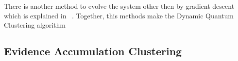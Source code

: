 There is another method to evolve the system other then by gradient descent which is explained in ~\cite{Weinstein2009}. Together, this methods make the Dynamic Quantum Clustering algorithm %



%



%



%

%



\subsection{Evidence Accumulation Clustering}

